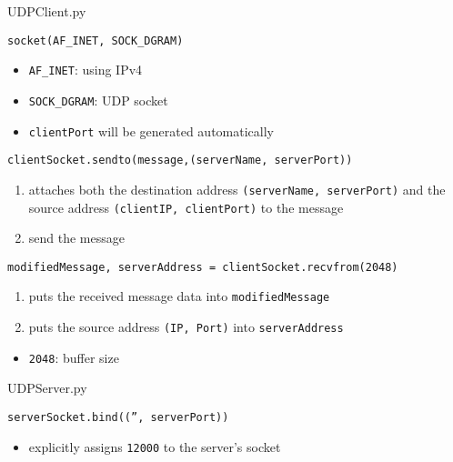 \begin{frame}[t,allowframebreaks]{UDPClient.py}
  \begin{center}
  \end{center}
  \begin{iblock}{\texttt{socket(AF\_INET, SOCK\_DGRAM)}}
    \begin{itemize}
    \item \texttt{AF\_INET}: using IPv4
    \item \texttt{SOCK\_DGRAM}: UDP socket
    \item \texttt{clientPort} will be generated automatically
    \end{itemize}
  \end{iblock}
  \begin{iblock}{\texttt{clientSocket.sendto(message,(serverName, serverPort))}}
    \begin{enumerate}
    \item attaches both the destination address \texttt{(serverName, serverPort)} and the
      source address \texttt{(clientIP, clientPort)} to the message
    \item send the message
    \end{enumerate}
  \end{iblock}
  \begin{iblock}{\texttt{modifiedMessage, serverAddress = clientSocket.recvfrom(2048)}}
    \begin{enumerate}
    \item puts the received message data into \texttt{modifiedMessage}
    \item puts the source address \texttt{(IP, Port)} into \texttt{serverAddress}
    \end{enumerate}
    \begin{itemize}
    \item \texttt{2048}: buffer size
    \end{itemize}
  \end{iblock}
\end{frame}

\begin{frame}{UDPServer.py}
  \begin{center}
  \end{center}
  \begin{iblock}{\texttt{serverSocket.bind(('', serverPort))}}
    \begin{itemize}
    \item explicitly assigns \texttt{12000} to the server's socket
    \end{itemize}
  \end{iblock}
\end{frame}

